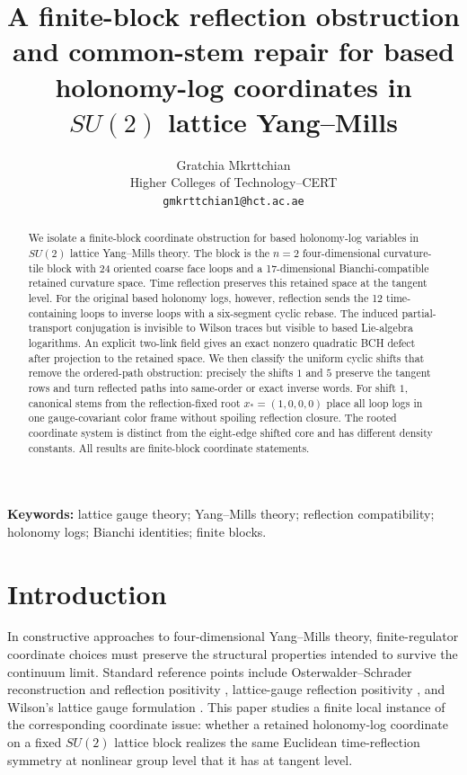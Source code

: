 \documentclass[10pt]{article}
\title{A finite-block reflection obstruction and common-stem repair for based holonomy-log coordinates in \(SU(2)\) lattice Yang--Mills}
\author{Gratchia Mkrttchian\\\small Higher Colleges of Technology--CERT\\\small \texttt{gmkrttchian1@hct.ac.ae}}
\date{}
\begin{document}
\maketitle


\begin{abstract}

We isolate a finite-block coordinate obstruction for based holonomy-log variables in \(SU(2)\) lattice Yang--Mills theory.  The block is the \(n=2\) four-dimensional curvature-tile block with 24 oriented coarse face loops and a 17-dimensional Bianchi-compatible retained curvature space.  Time reflection preserves this retained space at the tangent level.  For the original based holonomy logs, however, reflection sends the 12 time-containing loops to inverse loops with a six-segment cyclic rebase.  The induced partial-transport conjugation is invisible to Wilson traces but visible to based Lie-algebra logarithms.  An explicit two-link field gives an exact nonzero quadratic BCH defect after projection to the retained space.  We then classify the uniform cyclic shifts that remove the ordered-path obstruction: precisely the shifts \(1\) and \(5\) preserve the tangent rows and turn reflected paths into same-order or exact inverse words.  For shift \(1\), canonical stems from the reflection-fixed root \(x_\ast=(1,0,0,0)\) place all loop logs in one gauge-covariant color frame without spoiling reflection closure.  The rooted coordinate system is distinct from the eight-edge shifted core and has different density constants.  All results are finite-block coordinate statements.

\end{abstract}
\noindent\textbf{Keywords:} lattice gauge theory; Yang--Mills theory; reflection compatibility; holonomy logs; Bianchi identities; finite blocks.

\section{Introduction}

In constructive approaches to four-dimensional Yang--Mills theory, finite-regulator coordinate choices must preserve the structural properties intended to survive the continuum limit.  Standard reference points include Osterwalder--Schrader reconstruction and reflection positivity \cite{OsterwalderSchrader1973,OsterwalderSchrader1975}, lattice-gauge reflection positivity \cite{OsterwalderSeiler1978}, and Wilson's lattice gauge formulation \cite{Wilson1974,KogutSusskind1975}.  This paper studies a finite local instance of the corresponding coordinate issue: whether a retained holonomy-log coordinate on a fixed \(SU(2)\) lattice block realizes the same Euclidean time-reflection symmetry at nonlinear group level that it has at tangent level.
\end{document}
